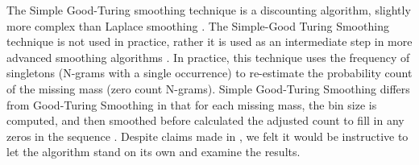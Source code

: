 \documentclass[ai15_group61_report.tex]{subfiles}
\begin{document}
The Simple Good-Turing smoothing technique is a discounting algorithm, slightly more complex than Laplace smoothing \cite{Jurafsky2000}. The Simple-Good Turing Smoothing technique is not used in practice, rather it is used as an intermediate step in more advanced smoothing algorithms \cite{chen-smoothing}. In practice, this technique uses the frequency of singletons (N-grams with a single occurrence) to re-estimate the probability count of the missing mass (zero count N-grams). Simple Good-Turing Smoothing differs from Good-Turing Smoothing in that for each missing mass, the bin size is computed, and then smoothed before calculated the adjusted count to fill in any zeros in the sequence \cite{Jurafsky2000}. Despite claims made in \cite{chen-smoothing}, we felt it would be instructive to let the algorithm stand on its own and examine the results.  
\end{document}
